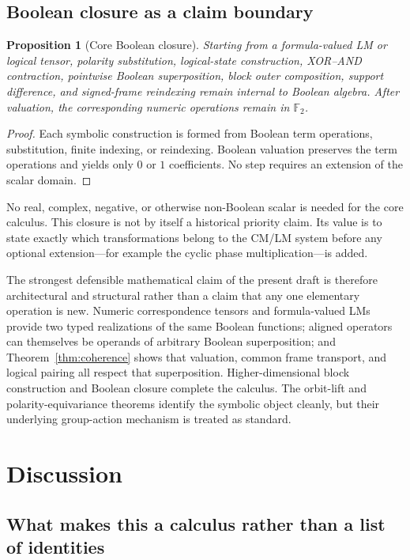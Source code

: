 \documentclass[11pt]{article}
\newtheorem{proposition}[theorem]{Proposition}
\theoremstyle{definition}
\theoremstyle{remark}
\newcommand{\F}{\mathbb F}
\begin{document}
\subsection{Boolean closure as a claim boundary}
\begin{proposition}[Core Boolean closure]
Starting from a formula-valued LM or logical tensor, polarity substitution, logical-state construction, XOR--AND contraction, pointwise Boolean superposition, block outer composition, support difference, and signed-frame reindexing remain internal to Boolean algebra.  After valuation, the corresponding numeric operations remain in $\F_2$.
\end{proposition}
\begin{proof}
Each symbolic construction is formed from Boolean term operations, substitution, finite indexing, or reindexing.  Boolean valuation preserves the term operations and yields only $0$ or $1$ coefficients.  No step requires an extension of the scalar domain.
\end{proof}
No real, complex, negative, or otherwise non-Boolean scalar is needed for the core calculus.  This closure is not by itself a historical priority claim.  Its value is to state exactly which transformations belong to the CM/LM system before any optional extension---for example the cyclic phase multiplication---is added.

The strongest defensible mathematical claim of the present draft is therefore architectural and structural rather than a claim that any one elementary operation is new.  Numeric correspondence tensors and formula-valued LMs provide two typed realizations of the same Boolean functions; aligned operators can themselves be operands of arbitrary Boolean superposition; and Theorem~\ref{thm:coherence} shows that valuation, common frame transport, and logical pairing all respect that superposition.  Higher-dimensional block construction and Boolean closure complete the calculus.  The orbit-lift and polarity-equivariance theorems identify the symbolic object cleanly, but their underlying group-action mechanism is treated as standard.

\section{Discussion}

\subsection{What makes this a calculus rather than a list of identities}
\end{document}
